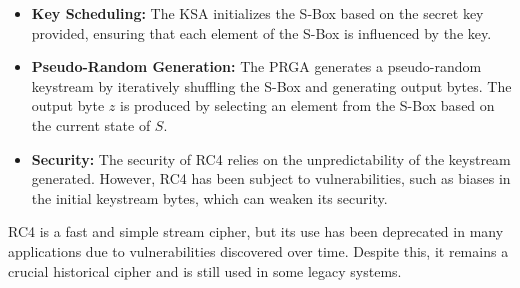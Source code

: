 \documentclass[11pt]{article}
\begin{document}
\begin{itemize}
    \item \textbf{Key Scheduling:} The KSA initializes the S-Box based on the secret key provided, ensuring that each element of the S-Box is influenced by the key.
    \item \textbf{Pseudo-Random Generation:} The PRGA generates a pseudo-random keystream by iteratively shuffling the S-Box and generating output bytes. The output byte \( z \) is produced by selecting an element from the S-Box based on the current state of \( S \).
    \item \textbf{Security:} The security of RC4 relies on the unpredictability of the keystream generated. However, RC4 has been subject to vulnerabilities, such as biases in the initial keystream bytes, which can weaken its security.
\end{itemize}

RC4 is a fast and simple stream cipher, but its use has been deprecated in many applications due to vulnerabilities discovered over time. Despite this, it remains a crucial historical cipher and is still used in some legacy systems.
\end{document}
